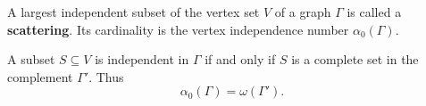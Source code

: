 A largest independent subset of the vertex set $V$ of a graph $\Gamma$ is called a \textbf{scattering}. Its cardinality is the vertex independence number $\alpha_0(\Gamma)$.

A subset $S \subseteq V$ is independent in $\Gamma$ if and only if $S$ is a complete set in the complement $\Gamma'$. Thus
$$\alpha_0(\Gamma) = \omega(\Gamma').$$
